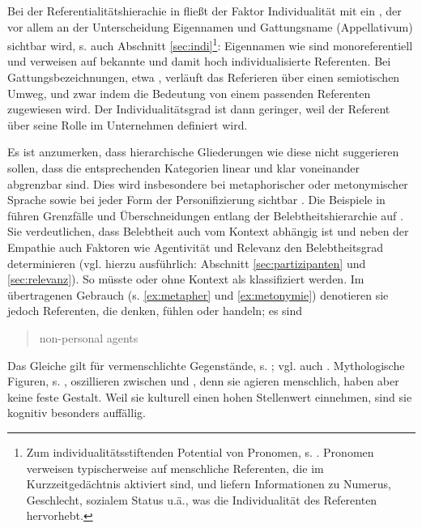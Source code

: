 Bei der Referentialitätshierachie in  fließt der Faktor Individualität mit ein \parencite{Timberlake1977,Hopper1980,Dahl1996,Fraurud1996,Yamamoto1999}, der vor allem an der Unterscheidung Eigennamen und Gattungsname (Appellativum) sichtbar wird, s. auch Abschnitt \ref{sec:indi}\footnote{Zum individualitätsstiftenden Potential von Pronomen, s. \textcite[29--31]{Yamamoto1999}. Pronomen verweisen typischerweise auf menschliche Referenten, die im Kurzzeitgedächtnis aktiviert sind, und liefern Informationen zu Numerus, Geschlecht, sozialem Status u.ä., was die Individualität des Referenten hervorhebt.}: Eigennamen wie  sind monoreferentiell und verweisen auf bekannte und damit hoch individualisierte Referenten. Bei Gattungsbezeichnungen, etwa , verläuft das Referieren über einen semiotischen Umweg, und zwar indem die Bedeutung von  einem passenden Referenten zugewiesen wird. Der Individualitätsgrad ist dann geringer, weil der Referent über seine Rolle im Unternehmen definiert wird.

Es ist anzumerken, dass hierarchische Gliederungen wie diese nicht suggerieren sollen, dass die entsprechenden Kategorien linear und klar voneinander abgrenzbar sind. Dies wird  insbesondere bei metaphorischer oder metonymischer Sprache sowie bei jeder Form der Personifizierung sichtbar \parencite[vgl.][62]{Dahl1996}. Die Beispiele in  führen Grenzfälle und Überschneidungen entlang der Belebtheitshierarchie auf \parencites()()[basierend auf][62--63]{Dahl1996}[18--20]{Yamamoto1999}. Sie verdeutlichen, dass Belebtheit auch vom Kontext abhängig ist und neben der Empathie auch Faktoren wie Agentivität und Relevanz den Belebtheitsgrad determinieren (vgl. hierzu ausführlich: Abschnitt \ref{sec:partizipanten} und \ref{sec:relevanz}).
So müsste  oder  ohne Kontext als  klassifiziert werden. Im übertragenen Gebrauch (s. \ref{ex:metapher} und \ref{ex:metonymie}) denotieren sie jedoch Referenten, die denken, fühlen oder handeln; es sind \blockcquote[62]{Dahl1996}{non-personal agents}. Das Gleiche gilt für vermenschlichte Gegenstände, s. ; vgl. auch \textcite[][]{Epley2007}. Mythologische Figuren, s. , oszillieren zwischen  und , denn sie agieren menschlich, haben aber keine feste Gestalt. Weil sie kulturell einen hohen Stellenwert einnehmen, sind sie kognitiv besonders auffällig. 
  

